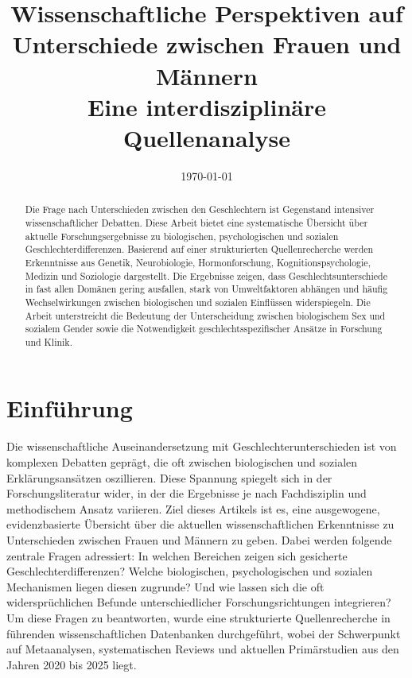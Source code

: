 \documentclass[12pt,a4paper]{article}
\begin{document}
	\title{Wissenschaftliche Perspektiven auf Unterschiede zwischen Frauen und Männern\\
		\large{Eine interdisziplinäre Quellenanalyse}}
	\author{}
	\date{\today}
	\maketitle
	\begin{abstract}
		Die Frage nach Unterschieden zwischen den Geschlechtern ist Gegenstand intensiver wissenschaftlicher Debatten. Diese Arbeit bietet eine systematische Übersicht über aktuelle Forschungsergebnisse zu biologischen, psychologischen und sozialen Geschlechterdifferenzen. Basierend auf einer strukturierten Quellenrecherche werden Erkenntnisse aus Genetik, Neurobiologie, Hormonforschung, Kognitionspsychologie, Medizin und Soziologie dargestellt. Die Ergebnisse zeigen, dass Geschlechtsunterschiede in fast allen Domänen gering ausfallen, stark von Umweltfaktoren abhängen und häufig Wechselwirkungen zwischen biologischen und sozialen Einflüssen widerspiegeln. Die Arbeit unterstreicht die Bedeutung der Unterscheidung zwischen biologischem Sex und sozialem Gender sowie die Notwendigkeit geschlechtsspezifischer Ansätze in Forschung und Klinik.
	\end{abstract}
	
	\section{Einführung}
	Die wissenschaftliche Auseinandersetzung mit Geschlechterunterschieden ist von komplexen Debatten geprägt, die oft zwischen biologischen und sozialen Erklärungsansätzen oszillieren. Diese Spannung spiegelt sich in der Forschungsliteratur wider, in der die Ergebnisse je nach Fachdisziplin und methodischem Ansatz variieren. Ziel dieses Artikels ist es, eine ausgewogene, evidenzbasierte Übersicht über die aktuellen wissenschaftlichen Erkenntnisse zu Unterschieden zwischen Frauen und Männern zu geben. Dabei werden folgende zentrale Fragen adressiert: In welchen Bereichen zeigen sich gesicherte Geschlechterdifferenzen? Welche biologischen, psychologischen und sozialen Mechanismen liegen diesen zugrunde? Und wie lassen sich die oft widersprüchlichen Befunde unterschiedlicher Forschungsrichtungen integrieren? Um diese Fragen zu beantworten, wurde eine strukturierte Quellenrecherche in führenden wissenschaftlichen Datenbanken durchgeführt, wobei der Schwerpunkt auf Metaanalysen, systematischen Reviews und aktuellen Primärstudien aus den Jahren 2020 bis 2025 liegt.
	
\end{document}
